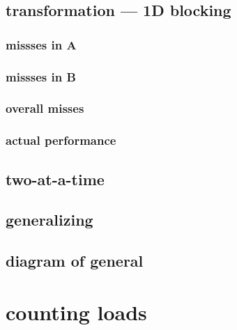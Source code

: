 \subsection{transformation --- 1D blocking}

\subsubsection{missses in A}

\subsubsection{missses in B}

\subsubsection{overall misses}

\subsubsection{actual performance}


\subsection{two-at-a-time}

%

\subsection{generalizing}


\subsection{diagram of general}


%

\section{counting loads}
%



